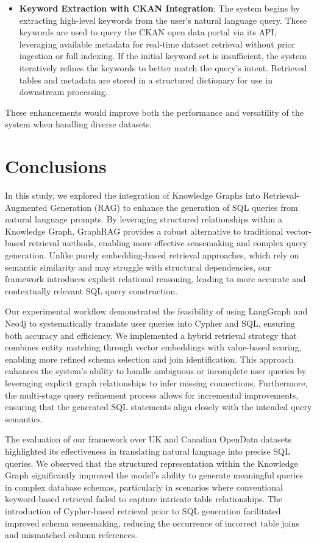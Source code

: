 \begin{itemize}
    \item \textbf{Keyword Extraction with CKAN Integration}: The system begins by extracting high-level keywords from the user’s natural language query. These keywords are used to query the CKAN open data portal via its API, leveraging available metadata for real-time dataset retrieval without prior ingestion or full indexing. If the initial keyword set is insufficient, the system iteratively refines the keywords to better match the query’s intent. Retrieved tables and metadata are stored in a structured dictionary for use in downstream processing.


\end{itemize}

These enhancements would improve both the performance and versatility of the system when handling diverse datasets.

\section{Conclusions}  

In this study, we explored the integration of Knowledge Graphs into Retrieval-Augmented Generation (RAG) to enhance the generation of SQL queries from natural language prompts. By leveraging structured relationships within a Knowledge Graph, GraphRAG provides a robust alternative to traditional vector-based retrieval methods, enabling more effective sensemaking and complex query generation. Unlike purely embedding-based retrieval approaches, which rely on semantic similarity and may struggle with structural dependencies, our framework introduces explicit relational reasoning, leading to more accurate and contextually relevant SQL query construction.  

Our experimental workflow demonstrated the feasibility of using LangGraph and Neo4j to systematically translate user queries into Cypher and SQL, ensuring both accuracy and efficiency. We implemented a hybrid retrieval strategy that combines entity matching through vector embeddings with value-based scoring, enabling more refined schema selection and join identification. This approach enhances the system’s ability to handle ambiguous or incomplete user queries by leveraging explicit graph relationships to infer missing connections. Furthermore, the multi-stage query refinement process allows for incremental improvements, ensuring that the generated SQL statements align closely with the intended query semantics.  

The evaluation of our framework over UK and Canadian OpenData datasets highlighted its effectiveness in translating natural language into precise SQL queries. We observed that the structured representation within the Knowledge Graph significantly improved the model’s ability to generate meaningful queries in complex database schemas, particularly in scenarios where conventional keyword-based retrieval failed to capture intricate table relationships. The introduction of Cypher-based retrieval prior to SQL generation facilitated improved schema sensemaking, reducing the occurrence of incorrect table joins and mismatched column references.  

